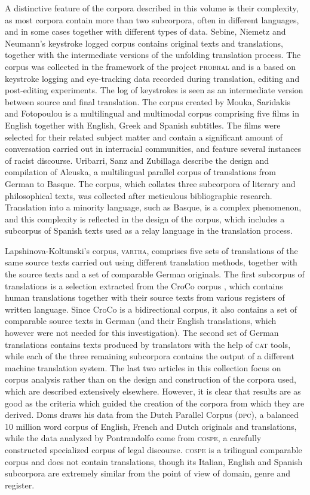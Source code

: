 \documentclass[output=paper]{LSP/langsci}
\begin{document}
A distinctive feature of the corpora described in this volume is their complexity, as most corpora contain more than two subcorpora, often in different languages, and in some cases together with different types of data. Sebine, Niemetz and Neumann’s keystroke logged corpus contains original texts and translations, together with the intermediate versions of the unfolding translation process. The corpus was collected in the framework of the project \textsc{probral} and is a based on keystroke logging and eye-tracking data recorded during translation, editing and post-editing experiments. The log of keystrokes is seen as an intermediate version between source and final translation. The corpus created by Mouka, Saridakis and Fotopoulou is a multilingual and multimodal corpus comprising five films in English together with English, Greek and Spanish subtitles. The films were selected for their related subject matter and contain a significant amount of conversation carried out in interracial communities, and feature several instances of racist discourse. Uribarri, Sanz and Zubillaga describe the design and compilation of Aleuska, a multilingual parallel corpus of translations from German to Basque. The corpus, which collates three subcorpora of literary and philosophical texts, was collected after meticulous bibliographic research. Translation into a minority language, such as Basque, is a complex phenomenon, and this complexity is reflected in the design of the corpus, which includes a subcorpus of Spanish texts used as a relay language in the translation process.

Lapshinova-Koltunski’s corpus, \textsc{vartra}, comprises five sets of translations of the same source texts carried out using different translation methods, together with the source texts and a set of comparable German originals. The first subcorpus of translations is a selection extracted from the CroCo corpus \citep{Croco:2013}, which contains human translations together with their source texts from various registers of written language. Since CroCo is a bidirectional corpus, it also contains a set of comparable source texts in German (and their English translations, which however were not needed for this investigation). The second set of German translations contains texts produced by translators with the help of \textsc{cat} tools, while each of the three remaining subcorpora contains the output of a different machine translation system. The last two articles in this collection focus on corpus analysis rather than on the design and construction of the corpora used, which are described extensively elsewhere. However, it is clear that results are as good as the criteria which guided the creation of the corpora from which they are derived. Doms draws his data from the Dutch Parallel Corpus (\textsc{dpc}), a balanced 10 million word corpus of English, French and Dutch originals and translations, while the data analyzed by Pontrandolfo come from \textsc{cospe}, a carefully constructed specialized corpus of legal discourse. \textsc{cospe} is a trilingual comparable corpus and does not contain translations, though its Italian, English and Spanish subcorpora are extremely similar from the point of view of domain, genre and register.
\end{document}
